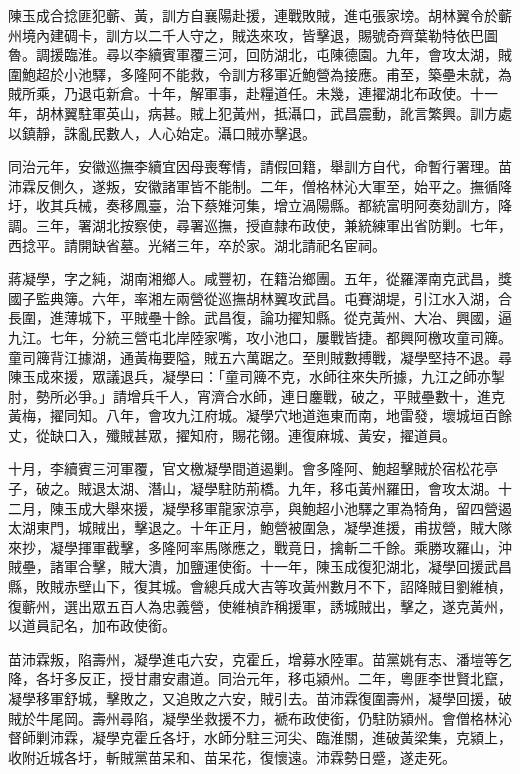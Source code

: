 \begin{pinyinscope}
陳玉成合捻匪犯蘄、黃，訓方自襄陽赴援，連戰敗賊，進屯張家塝。胡林翼令於蘄州境內建碉卡，訓方以二千人守之，賊迭來攻，皆擊退，賜號奇齊葉勒特依巴圖魯。調援臨淮。尋以李續賓軍覆三河，回防湖北，屯陳德園。九年，會攻太湖，賊圍鮑超於小池驛，多隆阿不能救，令訓方移軍近鮑營為接應。甫至，築壘未就，為賊所乘，乃退屯新倉。十年，解軍事，赴糧道任。未幾，連擢湖北布政使。十一年，胡林翼駐軍英山，病甚。賊上犯黃州，抵灄口，武昌震動，訛言繁興。訓方處以鎮靜，誅亂民數人，人心始定。灄口賊亦擊退。

同治元年，安徽巡撫李續宜因母喪奪情，請假回籍，舉訓方自代，命暫行署理。苗沛霖反側久，遂叛，安徽諸軍皆不能制。二年，僧格林沁大軍至，始平之。撫循降圩，收其兵械，奏移鳳臺，治下蔡雉河集，增立渦陽縣。都統富明阿奏劾訓方，降調。三年，署湖北按察使，尋署巡撫，授直隸布政使，兼統練軍出省防剿。七年，西捻平。請開缺省墓。光緒三年，卒於家。湖北請祀名宦祠。

蔣凝學，字之純，湖南湘鄉人。咸豐初，在籍治鄉團。五年，從羅澤南克武昌，獎國子監典簿。六年，率湘左兩營從巡撫胡林翼攻武昌。屯賽湖堤，引江水入湖，合長圍，進薄城下，平賊壘十餘。武昌復，論功擢知縣。從克黃州、大冶、興國，逼九江。七年，分統三營屯北岸陸家嘴，攻小池口，屢戰皆捷。都興阿檄攻童司簰。童司簰背江據湖，通黃梅要隘，賊五六萬踞之。至則賊數搏戰，凝學堅持不退。尋陳玉成來援，眾議退兵，凝學曰：「童司簰不克，水師往來失所據，九江之師亦掣肘，勢所必爭。」請增兵千人，宵濟合水師，連日鏖戰，破之，平賊壘數十，進克黃梅，擢同知。八年，會攻九江府城。凝學穴地道迤東而南，地雷發，壞城垣百餘丈，從缺口入，殲賊甚眾，擢知府，賜花翎。連復麻城、黃安，擢道員。

十月，李續賓三河軍覆，官文檄凝學間道遏剿。會多隆阿、鮑超擊賊於宿松花亭子，破之。賊退太湖、潛山，凝學駐防荊橋。九年，移屯黃州羅田，會攻太湖。十二月，陳玉成大舉來援，凝學移軍龍家涼亭，與鮑超小池驛之軍為犄角，留四營遏太湖東門，城賊出，擊退之。十年正月，鮑營被圍急，凝學進援，甫拔營，賊大隊來抄，凝學揮軍截擊，多隆阿率馬隊應之，戰竟日，擒斬二千餘。乘勝攻羅山，沖賊壘，諸軍合擊，賊大潰，加鹽運使銜。十一年，陳玉成復犯湖北，凝學回援武昌縣，敗賊赤壁山下，復其城。會總兵成大吉等攻黃州數月不下，詔降賊目劉維楨，復蘄州，選出眾五百人為忠義營，使維楨詐稱援軍，誘城賊出，擊之，遂克黃州，以道員記名，加布政使銜。

苗沛霖叛，陷壽州，凝學進屯六安，克霍丘，增募水陸軍。苗黨姚有志、潘塏等乞降，各圩多反正，授甘肅安肅道。同治元年，移屯潁州。二年，粵匪李世賢北竄，凝學移軍舒城，擊敗之，又追敗之六安，賊引去。苗沛霖復圍壽州，凝學回援，破賊於牛尾岡。壽州尋陷，凝學坐救援不力，褫布政使銜，仍駐防潁州。會僧格林沁督師剿沛霖，凝學克霍丘各圩，水師分駐三河尖、臨淮關，進破黃梁集，克潁上，收附近城各圩，斬賊黨苗呆和、苗呆花，復懷遠。沛霖勢日蹙，遂走死。


\end{pinyinscope}
